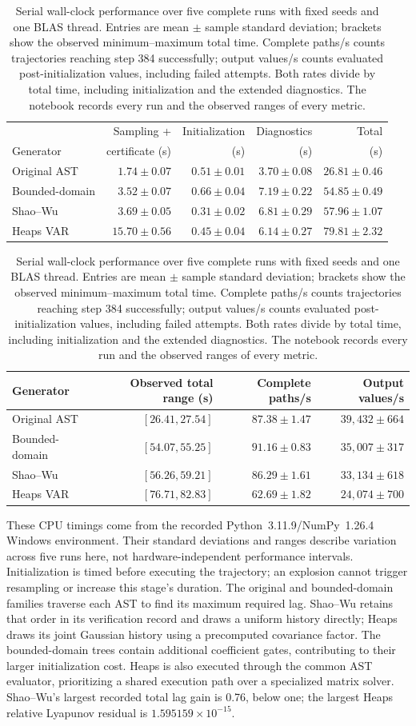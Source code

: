 \begin{table}[H]
\centering\small
\setlength{\tabcolsep}{5pt}
\begin{tabular}{@{}lrrrr@{}}
\toprule
& Sampling + & Initialization & Diagnostics & Total \\
Generator & certificate (s) & (s) & (s) & (s) \\
\midrule
Original AST & $1.74\pm0.07$ & $0.51\pm0.01$ & $3.70\pm0.08$ & $26.81\pm0.46$ \\
Bounded-domain & $3.52\pm0.07$ & $0.66\pm0.04$ & $7.19\pm0.22$ & $54.85\pm0.49$ \\
Shao--Wu & $3.69\pm0.05$ & $0.31\pm0.02$ & $6.81\pm0.29$ & $57.96\pm1.07$ \\
Heaps VAR & $15.70\pm0.56$ & $0.45\pm0.04$ & $6.14\pm0.27$ & $79.81\pm2.32$ \\
\bottomrule
\end{tabular}
\par\medskip
\begin{tabular}{@{}lrrr@{}}
\toprule
Generator & Observed total range (s) & Complete paths/s & Output values/s \\
\midrule
Original AST & $[26.41,27.54]$ & $87.38\pm1.47$ & $39{,}432\pm664$ \\
Bounded-domain & $[54.07,55.25]$ & $91.16\pm0.83$ & $35{,}007\pm317$ \\
Shao--Wu & $[56.26,59.21]$ & $86.29\pm1.61$ & $33{,}134\pm618$ \\
Heaps VAR & $[76.71,82.83]$ & $62.69\pm1.82$ & $24{,}074\pm700$ \\
\bottomrule
\end{tabular}
\caption{Serial wall-clock performance over five complete runs with fixed
seeds and one BLAS thread. Entries are mean $\pm$ sample standard deviation;
brackets show the observed minimum--maximum total time. Complete paths/s
counts trajectories reaching step 384 successfully; output values/s counts
evaluated post-initialization values, including failed attempts. Both rates
divide by total time, including initialization and the extended diagnostics.
The notebook records every run and the observed ranges of every metric.}
\label{tab:generator-speed}
\end{table}

These CPU timings come from the recorded Python~3.11.9/NumPy~1.26.4 Windows
environment. Their standard deviations and ranges describe variation across
five runs here, not hardware-independent performance intervals. Initialization
is timed before executing the trajectory; an explosion cannot trigger
resampling or increase this stage's duration. The original and bounded-domain
families traverse each AST to find its maximum required lag. Shao--Wu retains
that order in its verification record and draws a uniform history directly;
Heaps draws its joint Gaussian history using a precomputed covariance factor.
The bounded-domain trees contain additional coefficient gates, contributing
to their larger initialization cost. Heaps is also executed through the
common AST evaluator, prioritizing a shared execution path over a specialized
matrix solver. Shao--Wu's largest recorded total lag gain is 0.76, below one;
the largest Heaps relative Lyapunov residual is
$1.595159\times10^{-15}$.

